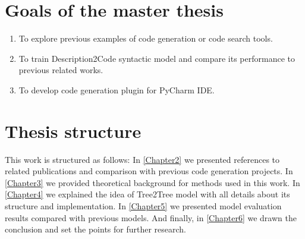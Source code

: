 \section{Goals of the master thesis}

\begin{enumerate}
	\item To explore previous examples of code generation or code search tools.
	\item To train Description2Code syntactic model and compare its performance to previous related works.
	\item To develop code generation plugin for PyCharm IDE.
\end{enumerate}

\section{Thesis structure}
This work is structured as follows: In \ref{Chapter2} we presented references to related publications and comparison with previous code generation projects. In \ref{Chapter3} we provided theoretical background for methods used in this work. In \ref{Chapter4} we explained the idea of Tree2Tree model with all details about its structure and implementation. In \ref{Chapter5} we presented model evaluation results compared with previous models. And finally, in \ref{Chapter6} we drawn the conclusion and set the points for further research.